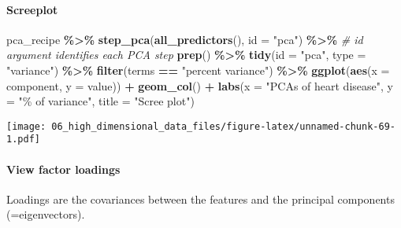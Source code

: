 \documentclass[
]{book}
\newenvironment{Shaded}{\begin{snugshade}}{\end{snugshade}}
\newcommand{\CommentTok}[1]{\textcolor[rgb]{0.56,0.35,0.01}{\textit{#1}}}
\newcommand{\DataTypeTok}[1]{\textcolor[rgb]{0.13,0.29,0.53}{#1}}
\newcommand{\KeywordTok}[1]{\textcolor[rgb]{0.13,0.29,0.53}{\textbf{#1}}}
\newcommand{\NormalTok}[1]{#1}
\newcommand{\OperatorTok}[1]{\textcolor[rgb]{0.81,0.36,0.00}{\textbf{#1}}}
\newcommand{\StringTok}[1]{\textcolor[rgb]{0.31,0.60,0.02}{#1}}
\begin{document}
\hypertarget{screeplot}{%
\paragraph{Screeplot}\label{screeplot}}

\begin{Shaded}
\begin{Highlighting}[]
\NormalTok{pca\_recipe }\OperatorTok{\%\textgreater{}\%}
\StringTok{  }\KeywordTok{step\_pca}\NormalTok{(}\KeywordTok{all\_predictors}\NormalTok{(), }
           \DataTypeTok{id =} \StringTok{"pca"}\NormalTok{) }\OperatorTok{\%\textgreater{}\%}\StringTok{ }\CommentTok{\# id argument identifies each PCA step }
\StringTok{  }\KeywordTok{prep}\NormalTok{() }\OperatorTok{\%\textgreater{}\%}
\StringTok{  }\KeywordTok{tidy}\NormalTok{(}\DataTypeTok{id =} \StringTok{"pca"}\NormalTok{, }\DataTypeTok{type =} \StringTok{"variance"}\NormalTok{) }\OperatorTok{\%\textgreater{}\%}
\StringTok{  }\KeywordTok{filter}\NormalTok{(terms }\OperatorTok{==}\StringTok{ "percent variance"}\NormalTok{) }\OperatorTok{\%\textgreater{}\%}\StringTok{ }
\StringTok{  }\KeywordTok{ggplot}\NormalTok{(}\KeywordTok{aes}\NormalTok{(}\DataTypeTok{x =}\NormalTok{ component, }\DataTypeTok{y =}\NormalTok{ value)) }\OperatorTok{+}
\StringTok{    }\KeywordTok{geom\_col}\NormalTok{() }\OperatorTok{+}
\StringTok{    }\KeywordTok{labs}\NormalTok{(}\DataTypeTok{x =} \StringTok{"PCAs of heart disease"}\NormalTok{,}
         \DataTypeTok{y =} \StringTok{"\% of variance"}\NormalTok{,}
         \DataTypeTok{title =} \StringTok{"Scree plot"}\NormalTok{)}
\end{Highlighting}
\end{Shaded}

\texttt{[image: 06\_high\_dimensional\_data\_files/figure-latex/unnamed-chunk-69-1.pdf]}

\hypertarget{view-factor-loadings}{%
\paragraph{View factor loadings}\label{view-factor-loadings}}

Loadings are the covariances between the features and the principal components (=eigenvectors).
\end{document}
